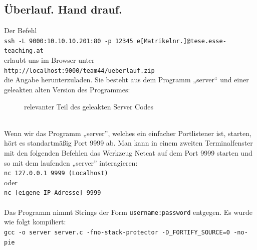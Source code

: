 \documentclass[12pt, a4paper, titlepage, oneside]{scrartcl}
\begin{document}
	\subsection{\"Uberlauf. Hand drauf.}
	Der Befehl \\
	\lstinline{ssh -L 9000:10.10.10.201:80 -p 12345 e[Matrikelnr.]@tese.esse-teaching.at} \\
	erlaubt uns im Browser unter \\
	\lstinline{http://localhost:9000/team44/ueberlauf.zip} \\
	die Angabe herunterzuladen. Sie besteht aus dem Programm „server“ und einer geleakten alten
	Version des Programmes:
	\begin{figure}[h!]
		\centering
		\caption{relevanter Teil des geleakten Server Codes}
		\label{fig:uhd}
	\end{figure}
	\\
	Wenn wir das Programm „server”, welches ein einfacher Portlistener ist, starten, hört es
	standartmäßig Port 9999 ab. Man kann in einem zweiten Terminalfenster mit den folgenden
	Befehlen das Werkzeug Netcat auf dem Port 9999 starten und so mit dem laufenden „server”
	interagieren: \\
	\lstinline{nc 127.0.0.1 9999 (Localhost)}\\
	oder\\
	\lstinline{nc [eigene IP-Adresse] 9999} \\
	\\
	Das Programm nimmt Strings der Form \lstinline{username:password} entgegen. Es wurde wie folgt
	kompiliert: \\
	\lstinline{gcc -o server server.c -fno-stack-protector -D_FORTIFY_SOURCE=0 -no-pie}\\
\end{document}
